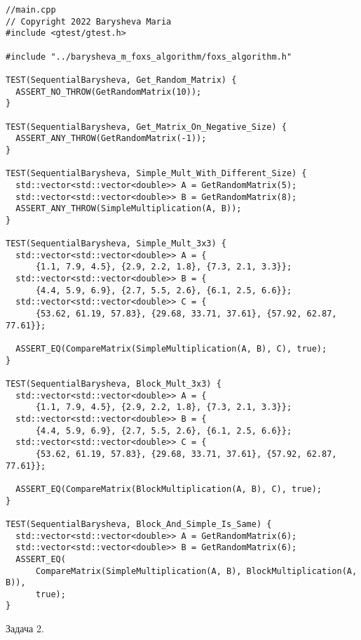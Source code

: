 \documentclass[12pt]{article}
\begin{document}
\begin{lstlisting}
//main.cpp
// Copyright 2022 Barysheva Maria
#include <gtest/gtest.h>

#include "../barysheva_m_foxs_algorithm/foxs_algorithm.h"

TEST(SequentialBarysheva, Get_Random_Matrix) {
  ASSERT_NO_THROW(GetRandomMatrix(10));
}

TEST(SequentialBarysheva, Get_Matrix_On_Negative_Size) {
  ASSERT_ANY_THROW(GetRandomMatrix(-1));
}

TEST(SequentialBarysheva, Simple_Mult_With_Different_Size) {
  std::vector<std::vector<double>> A = GetRandomMatrix(5);
  std::vector<std::vector<double>> B = GetRandomMatrix(8);
  ASSERT_ANY_THROW(SimpleMultiplication(A, B));
}

TEST(SequentialBarysheva, Simple_Mult_3x3) {
  std::vector<std::vector<double>> A = {
      {1.1, 7.9, 4.5}, {2.9, 2.2, 1.8}, {7.3, 2.1, 3.3}};
  std::vector<std::vector<double>> B = {
      {4.4, 5.9, 6.9}, {2.7, 5.5, 2.6}, {6.1, 2.5, 6.6}};
  std::vector<std::vector<double>> C = {
      {53.62, 61.19, 57.83}, {29.68, 33.71, 37.61}, {57.92, 62.87, 77.61}};

  ASSERT_EQ(CompareMatrix(SimpleMultiplication(A, B), C), true);
}

TEST(SequentialBarysheva, Block_Mult_3x3) {
  std::vector<std::vector<double>> A = {
      {1.1, 7.9, 4.5}, {2.9, 2.2, 1.8}, {7.3, 2.1, 3.3}};
  std::vector<std::vector<double>> B = {
      {4.4, 5.9, 6.9}, {2.7, 5.5, 2.6}, {6.1, 2.5, 6.6}};
  std::vector<std::vector<double>> C = {
      {53.62, 61.19, 57.83}, {29.68, 33.71, 37.61}, {57.92, 62.87, 77.61}};

  ASSERT_EQ(CompareMatrix(BlockMultiplication(A, B), C), true);
}

TEST(SequentialBarysheva, Block_And_Simple_Is_Same) {
  std::vector<std::vector<double>> A = GetRandomMatrix(6);
  std::vector<std::vector<double>> B = GetRandomMatrix(6);
  ASSERT_EQ(
      CompareMatrix(SimpleMultiplication(A, B), BlockMultiplication(A, B)),
      true);
}

\end{lstlisting}
\par Задача 2.
\end{document}
